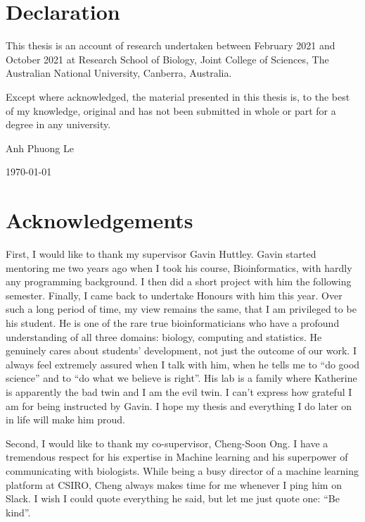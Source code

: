\chapter*{Declaration}

This thesis is an account of research undertaken between February 2021 and  October 2021 at Research School of Biology, Joint College of Sciences, The Australian National University, Canberra, Australia.

Except where acknowledged, the material presented in this thesis is, to the best of my knowledge, original and has not been submitted in whole or part for a degree in any university.

\vspace{20mm}  %

\large
\hspace{12cm} Anh Phuong Le\par
\hspace{12cm} \today

\normalsize
\chapter*{Acknowledgements}

First, I would like to thank my supervisor Gavin Huttley. Gavin started mentoring me two years ago when I took his course, Bioinformatics, with hardly any programming background. I then did a short project with him the following semester. Finally, I came back to undertake Honours with him this year. Over such a long period of time, my view remains the same, that I am privileged to be his student. He is one of the rare true bioinformaticians who have a profound understanding of all three domains: biology, computing and statistics. He genuinely cares about students' development, not just the outcome of our work. I always feel extremely assured when I talk with him, when he tells me to ``do good science'' and to ``do what we believe is right''. His lab is a family where Katherine is apparently the bad twin and I am the evil twin. I can't express how grateful I am for being instructed by Gavin. I hope my thesis and everything I do later on in life will make him proud.

Second, I would like to thank my co-supervisor, Cheng-Soon Ong. I have a tremendous respect for his expertise in Machine learning and his superpower of communicating with biologists. While being a busy director of a machine learning platform at CSIRO, Cheng always makes time for me whenever I ping him on Slack. I wish I could quote everything he said, but let me just quote one: ``Be kind''.

